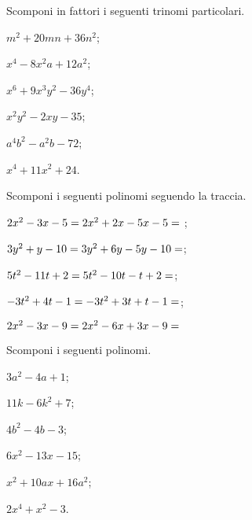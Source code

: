 \begin{esercizio}
 \label{ese:13.64}
 Scomponi in fattori i seguenti trinomi particolari.
 \begin{multicols}{3}
 \begin{enumeratea}
 \item $m^{2}+20mn+36n^{2}$;
 \item $x^{4}-8x^{2}a+12a^{2}$;
 \item $x^{6}+9x^{3}y^{2}-36y^{4}$;
 \item $x^{2}y^{2}-2xy-35$;
 \item $a^{4}b^{2}-a^{2}b-72$;
 \item $x^{4}+11x^{2}+24$.
 \end{enumeratea}
\end{multicols}
\end{esercizio}
\pagebreak
\begin{esercizio}[\Ast]
 \label{ese:13.65}
 Scomponi i seguenti polinomi seguendo la
traccia.
 \begin{enumeratea}
 \item $2x^{{2}}-3x-5=2x^{2}+2x-5x-5=\dotfill~$;
 \item $3y^{{2}}+y-10 = 3y^{2}+6y-5y-10 =\dotfill$;
 \item $5t^{{2}}-11t+2 = 5t^{2}-10t-t+2 =\dotfill$;
 \item $-3t^{{2}}+4t-1= -3t^{2}+3t+t-1 = \dotfill$;
 \item $2x^{2}-3x-9= 2x^{2}-6x+3x-9 = \dotfill$
 \end{enumeratea}
\end{esercizio}

\begin{esercizio}
 \label{ese:13.66}
 Scomponi i seguenti polinomi.
\begin{multicols}{3}
 \begin{enumeratea}
 \item $3a^{{2}}-4a+1$;
 \item $11k-6k^{2}+7$;
 \item $4b^{{2}}-4b-3$;
 \item $6x^{2}-13x-15$;
 \item $x^{2}+10ax+16a^{2}$;
 \item $2x^{{4}}+x^{{2}}-3$.
 \end{enumeratea}
\end{multicols}
 \end{esercizio}


